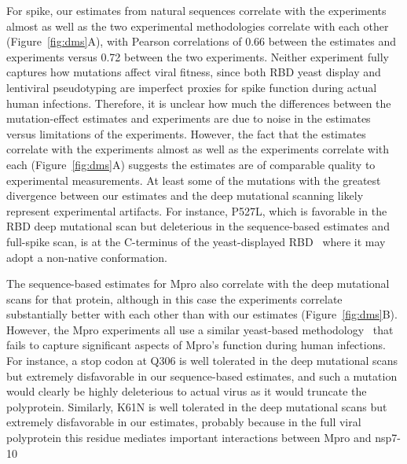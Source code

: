 \documentclass[9pt,twocolumn,twoside]{gsajnl_modified}
\begin{document}
For spike, our estimates from natural sequences correlate with the experiments almost as well as the two experimental methodologies correlate with each other (Figure~\ref{fig:dms}A), with Pearson correlations of 0.66 between the estimates and experiments versus 0.72 between the two experiments.
Neither experiment fully captures how mutations affect viral fitness, since both RBD yeast display and lentiviral pseudotyping are imperfect proxies for spike function during actual human infections.
Therefore, it is unclear how much the differences between the mutation-effect estimates and experiments are due to noise in the estimates versus limitations of the experiments.
However, the fact that the estimates correlate with the experiments almost as well as the experiments correlate with each (Figure~\ref{fig:dms}A) suggests the estimates are of comparable quality to experimental measurements.
At least some of the mutations with the greatest divergence between our estimates and the deep mutational scanning likely represent experimental artifacts.
For instance, P527L, which is favorable in the RBD deep mutational scan but deleterious in the sequence-based estimates and full-spike scan, is at the C-terminus of the yeast-displayed RBD~\citep{starr2020deep} where it may adopt a non-native conformation.

The sequence-based estimates for Mpro also correlate with the deep mutational scans for that protein, although in this case the experiments correlate substantially better with each other than with our estimates (Figure~\ref{fig:dms}B).
However, the Mpro experiments all use a similar yeast-based methodology~\citep{flynn2022,flynn2023,iketani2022functional} that fails to capture significant aspects of Mpro's function during human infections.
For instance, a stop codon at Q306 is well tolerated in the deep mutational scans but extremely disfavorable in our sequence-based estimates, and such a mutation would clearly be highly deleterious to actual virus as it would truncate the polyprotein.
Similarly, K61N is well tolerated in the deep mutational scans but extremely disfavorable in our estimates, probably because in the full viral polyprotein this residue mediates important interactions between Mpro and nsp7-10~\citep{yadav2022biochemical}
\end{document}
